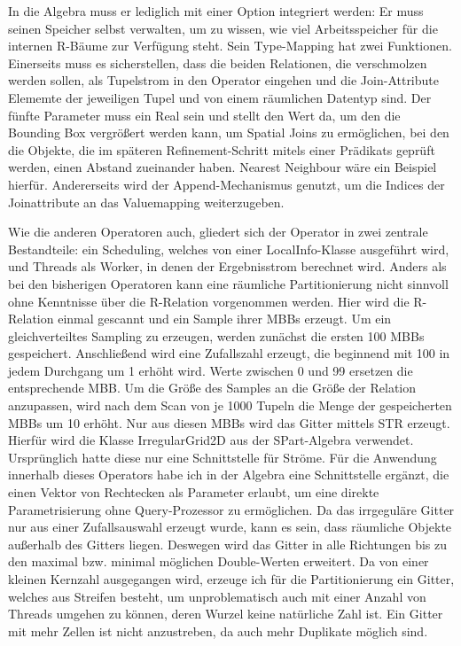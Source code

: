 \documentclass[a4paper,12pt,twoside]{article}
\begin{document}
In die Algebra muss er lediglich mit einer Option integriert werden: Er muss seinen Speicher selbst verwalten, um zu wissen, wie viel Arbeitsspeicher für die internen R-Bäume zur Verfügung steht. Sein Type-Mapping hat zwei Funktionen. Einerseits muss es sicherstellen, dass die beiden Relationen, die verschmolzen werden sollen, als Tupelstrom in den Operator eingehen und die Join-Attribute Elememte der jeweiligen Tupel und von einem räumlichen Datentyp sind. Der fünfte Parameter muss ein Real sein und stellt den Wert da, um den die Bounding Box vergrößert werden kann, um Spatial Joins zu ermöglichen, bei den die Objekte, die im späteren Refinement-Schritt mitels einer Prädikats geprüft werden, einen Abstand zueinander haben. Nearest Neighbour wäre ein Beispiel hierfür. Andererseits wird der Append-Mechanismus genutzt, um die Indices der Joinattribute an das Valuemapping weiterzugeben.

Wie die anderen Operatoren auch, gliedert sich der Operator in zwei zentrale Bestandteile: ein Scheduling, welches von einer LocalInfo-Klasse ausgeführt wird, und Threads als Worker, in denen der Ergebnisstrom berechnet wird. Anders als bei den bisherigen Operatoren kann eine räumliche Partitionierung nicht sinnvoll ohne Kenntnisse über die R-Relation vorgenommen werden. Hier wird die R-Relation einmal gescannt und ein Sample ihrer MBBs erzeugt. Um ein gleichverteiltes Sampling zu erzeugen, werden zunächst die ersten 100 MBBs gespeichert. Anschließend wird eine Zufallszahl erzeugt, die beginnend mit 100 in jedem Durchgang um 1 erhöht wird. Werte zwischen 0 und 99 ersetzen die entsprechende MBB. Um die Größe des Samples an die Größe der Relation anzupassen, wird nach dem Scan von je 1000 Tupeln die Menge der gespeicherten MBBs um 10 erhöht. Nur aus diesen MBBs wird das Gitter mittels STR erzeugt. Hierfür wird die Klasse IrregularGrid2D aus der SPart-Algebra verwendet. Ursprünglich hatte diese nur eine Schnittstelle für Ströme. Für die Anwendung innerhalb dieses Operators habe ich in der Algebra eine Schnittstelle ergänzt, die einen Vektor von Rechtecken als Parameter erlaubt, um eine direkte Parametrisierung ohne Query-Prozessor zu ermöglichen. Da das irrgeguläre Gitter nur aus einer Zufallsauswahl erzeugt wurde, kann es sein, dass räumliche Objekte außerhalb des Gitters liegen. Deswegen wird das Gitter in alle Richtungen bis zu den maximal bzw. minimal möglichen Double-Werten erweitert. Da von einer kleinen Kernzahl ausgegangen wird, erzeuge ich für die Partitionierung ein Gitter, welches aus Streifen besteht, um unproblematisch auch mit einer Anzahl von Threads umgehen zu können, deren Wurzel keine natürliche Zahl ist. Ein Gitter mit mehr Zellen ist nicht anzustreben, da auch mehr Duplikate möglich sind.
\end{document}
